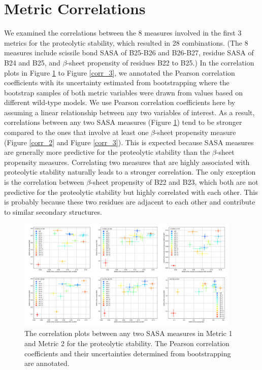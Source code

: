 \documentclass[9pt]{elife}
\begin{document}
\section{Metric Correlations}
We examined the correlations between the 8 measures involved in the first 3 metrics for the proteolytic stability, which resulted in 28 combinations. (The 8 measures include scissile bond SASA of B25-B26 and B26-B27, residue SASA of B24 and B25, and $\beta$-sheet propensity of residues B22 to B25.) In the correlation plots in Figure \ref{corr_1} to Figure \ref{corr_3}, we annotated the Pearson correlation coefficients with its uncertainty estimated from bootstrapping where the bootstrap samples of both metric variables were drawn from values based on different wild-type models. We use Pearson correlation coefficients here by assuming a linear relationship between any two variables of interest. As a result, correlations between any two SASA measures (Figure \ref{corr_1}) tend to be stronger compared to the ones that involve at least one $\beta$-sheet propensity measure (Figure \ref{corr_2} and Figure \ref{corr_3}). This is expected because SASA measures are generally more predictive for the proteolytic stability than the $\beta$-sheet propensity measures. Correlating two measures that are highly associated with proteolytic stability naturally leads to a stronger correlation. The only exception is the correlation between $\beta$-sheet propensity of B22 and B23, which both are not predictive for the proteolytic stability but highly correlated with each other. This is probably because these two residues are adjacent to each other and contribute to similar secondary structures. 

\begin{figure}[H]
\centering
\includegraphics[width=0.95\textwidth]{Figures/Fig_SASA_metrics_correlation.png}
\caption{The correlation plots between any two SASA measures in Metric 1 and Metric 2 for the proteolytic stability. The Pearson correlation coefficients and their uncertainties determined from bootstrapping are annotated.}
\label{corr_1}
\end{figure}
\end{document}
